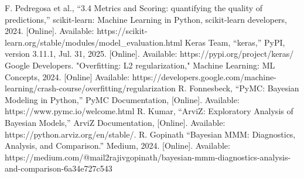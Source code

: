 \documentclass[letter]{article}
\begin{document}
\begin{thebibliography}{00}
 F. Pedregosa et al., “3.4 Metrics and Scoring: quantifying the quality of predictions,” scikit-learn: Machine Learning in Python, scikit-learn developers, 2024. [Online]. Available: https://scikit-learn.org/stable/modules/model\_evaluation.html
 Keras Team, “keras,” PyPI, version 3.11.1, Jul. 31, 2025. [Online]. Available: https://pypi.org/project/keras/  
 Google Developers. "Overfitting: L2 regularization," Machine Learning: ML Concepts, 2024. [Online] Available: https://developers.google.com/machine-learning/crash-course/overfitting/regularization
 R. Fonnesbeck, “PyMC: Bayesian Modeling in Python,” PyMC Documentation, [Online]. Available: https://www.pymc.io/welcome.html
R. Kumar, “ArviZ: Exploratory Analysis of Bayesian Models,” ArviZ Documentation, [Online]. Available: https://python.arviz.org/en/stable/.
 R. Gopinath “Bayesian MMM: Diagnostics, Analysis, and Comparison.” Medium, 2024. [Online]. Available: https://medium.com/@mail2rajivgopinath/bayesian-mmm-diagnostics-analysis-and-comparison-6a34e727c543
\end{thebibliography}
\newpage
\appendix
\end{document}
